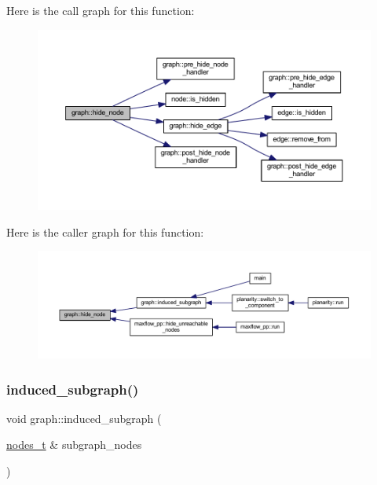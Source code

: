 Here is the call graph for this function\+:
\nopagebreak
\begin{figure}[H]
\begin{center}
\leavevmode
\includegraphics[width=350pt]{classgraph_a214618b5e3c02695779350532506e225_cgraph}
\end{center}
\end{figure}
Here is the caller graph for this function\+:
\nopagebreak
\begin{figure}[H]
\begin{center}
\leavevmode
\includegraphics[width=350pt]{classgraph_a214618b5e3c02695779350532506e225_icgraph}
\end{center}
\end{figure}
\mbox{\label{classgraph_a15b766094bb0b97ef53e06e7c26b2197}} 
\subsubsection{\texorpdfstring{induced\+\_\+subgraph()}{induced\_subgraph()}}
{\footnotesize\ttfamily void graph\+::induced\+\_\+subgraph (\begin{DoxyParamCaption}\item[{\mbox{\hyperlink{edge_8h_a22ac17689106ba21a84e7bc54d1199d6}{nodes\+\_\+t}} \&}]{subgraph\+\_\+nodes }\end{DoxyParamCaption})}

